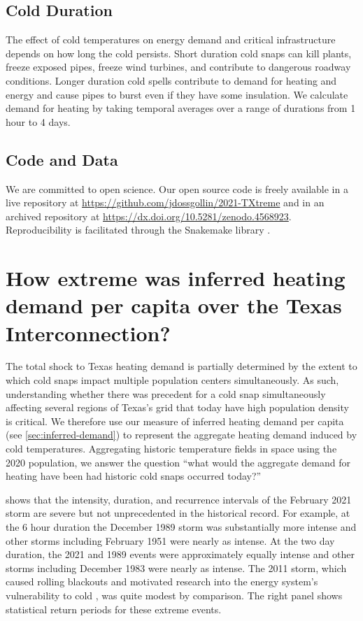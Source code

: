 \documentclass[12pt]{iopart}
\begin{document}
\subsection{Cold Duration}

The effect of cold temperatures on energy demand and critical infrastructure depends on how long the cold persists.
Short duration cold snaps can kill plants, freeze exposed pipes, freeze wind turbines, and contribute to dangerous roadway conditions.
Longer duration cold spells contribute to demand for heating and energy and cause pipes to burst even if they have some insulation.
We calculate demand for heating by taking temporal averages over a range of durations from 1 hour to 4 days.

\subsection{Code and Data}

We are committed to open science.
Our open source code is freely available in a live repository at \url{https://github.com/jdossgollin/2021-TXtreme} and in an archived repository at \url{https://dx.doi.org/10.5281/zenodo.4568923}.
Reproducibility is facilitated through the Snakemake library \cite{koster_snakemake:2012}.

\section{How extreme was inferred heating demand per capita over the Texas Interconnection?}

The total shock to Texas heating demand is partially determined by the extent to which cold snaps impact multiple population centers simultaneously.
As such, understanding whether there was precedent for a cold snap simultaneously affecting several regions of Texas's grid that today have high population density is critical.
We therefore use our measure of inferred heating demand per capita (see \cref{sec:inferred-demand}) to represent the aggregate heating demand induced by cold temperatures.
Aggregating historic temperature fields in space using the 2020 population, we answer the question ``what would the aggregate demand for heating have been had historic cold snaps occurred today?''

 shows that the intensity, duration, and recurrence intervals of the February 2021 storm are severe but not unprecedented in the historical record.
For example, at the 6 hour duration the December 1989 storm was substantially more intense and other storms including February 1951 were nearly as intense.
At the two day duration, the 2021 and 1989 events were approximately equally intense and other storms including December 1983 were nearly as intense.
The 2011 storm, which caused rolling blackouts and motivated research into the energy system's vulnerability to cold \cite{ferc_outages:2011}, was quite modest by comparison.
The right panel shows statistical return periods for these extreme events.
\end{document}

